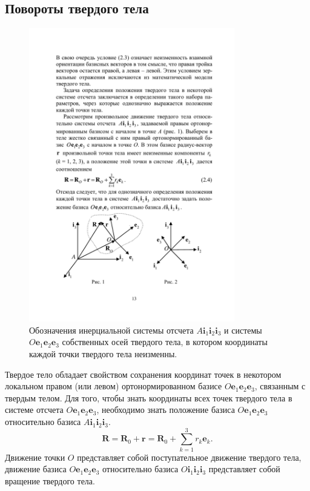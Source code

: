 \documentclass{article}
\begin{document}
\subsection{Повороты твердого тела}
\begin{figure}
\centering
\includegraphics[width=0.8\textwidth]{pic/BI_notations.pdf}
\caption{\label{fig:BI_notation}Обозначения инерциальной системы отсчета
$A\mathbf{i}_1\mathbf{i}_2\mathbf{i}_3$ и системы
$O\mathbf{e}_1\mathbf{e}_2\mathbf{e}_3$ собственных осей твердого тела, в
котором координаты каждой точки твердого тела неизменны.}
\end{figure}
Твердое тело обладает свойством сохранения координат точек в некотором
локальном правом (или левом) ортонормированном базисе
$O\mathbf{e}_1\mathbf{e}_2\mathbf{e}_3$, связанным с твердым телом. Для того,
чтобы знать координаты всех точек твердого тела в системе отсчета
$O\mathbf{e}_1\mathbf{e}_2\mathbf{e}_3$, необходимо знать положение базиса
$O\mathbf{e}_1\mathbf{e}_2\mathbf{e}_3$ относительно базиса
$A\mathbf{i}_1\mathbf{i}_2\mathbf{i}_3$.
$$
\mathbf{R}=\mathbf{R}_0+\mathbf{r} = \mathbf{R}_0 +
\sum_{k=1}^{3}r_k\mathbf{e}_k.
$$
Движение точки $O$ представляет собой поступательное движение твердого тела,
движение базиса $O\mathbf{e}_1\mathbf{e}_2\mathbf{e}_3$ относительно базиса
$O\mathbf{i}_1\mathbf{i}_2\mathbf{i}_3$ представляет собой вращение твердого
тела.
\end{document}
